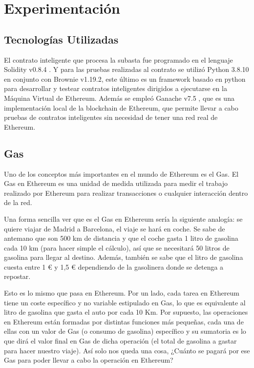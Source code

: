     \section{Experimentación}
    \subsection{Tecnologías Utilizadas}
      El contrato inteligente que procesa la subasta fue programado en el lenguaje Solidity v0.8.4 
      \parencite{solidity0.8.4}. Y para las pruebas realizadas al contrato se utilizó Python 3.8.10 
      \parencite{python3.8} en conjunto con Brownie v1.19.2, este último es un framework basado en python
      para desarrollar y testear contratos inteligentes dirigidos a ejecutarse en la Máquina Virtual de 
      Ethereum. Además se empleó Ganache v7.5 \parencite{ganache7.5}, que es una implementación local de la blockchain de
      Ethereum, que permite llevar a cabo pruebas de contratos inteligentes sin necesidad de tener una red
      real de Ethereum.

      \subsection{Gas}
        Uno de los conceptos más importantes en el mundo de Ethereum es el Gas. El Gas en Ethereum es una 
        unidad de medida utilizada para medir el trabajo realizado por Ethereum para realizar transacciones o 
        cualquier interacción dentro de la red.


        Una forma sencilla ver que es el Gas en Ethereum sería la siguiente analogía: se quiere viajar 
        de Madrid a Barcelona, el viaje se hará en coche. Se sabe de antemano que son 
        500 km de distancia y que el coche gasta 1 litro de gasolina cada 10 km (para hacer simple el cálculo), 
        así que se necesitará 50 litros de gasolina para llegar al destino. Además, también se sabe que el 
        litro de gasolina cuesta entre 1 € y 1,5 € dependiendo de la gasolinera donde se detenga a repostar.


        Esto es lo mismo que pasa en Ethereum. Por un lado, cada tarea en Ethereum tiene un coste específico 
        y no variable estipulado en Gas, lo que es equivalente al litro de gasolina que gasta el auto por cada 
        10 Km. Por supuesto, las operaciones en Ethereum están formadas por distintas funciones más pequeñas, 
        cada una de ellas con un valor de Gas (o consumo de gasolina) específico y su sumatoria es lo que 
        dirá el valor final en Gas de dicha operación (el total de gasolina a gastar para hacer nuestro viaje).
        Así solo nos queda una cosa, ¿Cuánto se pagará por ese Gas para poder llevar a cabo la operación en 
        Ethereum?


